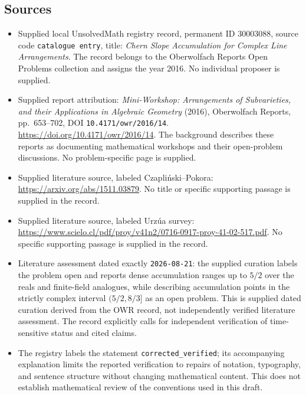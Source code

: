 \documentclass[11pt]{article}
\begin{document}
\subsection{Sources}
\begin{itemize}
\item Supplied local UnsolvedMath registry record, permanent ID \(30003088\), source code \texttt{catalogue entry}, title: \emph{Chern Slope Accumulation for Complex Line Arrangements}. The record belongs to the Oberwolfach Reports Open Problems collection and assigns the year 2016. No individual proposer is supplied.
\item Supplied report attribution: \emph{Mini-Workshop: Arrangements of Subvarieties, and their Applications in Algebraic Geometry} (2016), Oberwolfach Reports, pp.\ 653--702, DOI \texttt{10.4171/owr/2016/14}. \url{https://doi.org/10.4171/owr/2016/14}. The background describes these reports as documenting mathematical workshops and their open-problem discussions. No problem-specific page is supplied.
\item Supplied literature source, labeled Czapliński--Pokora: \url{https://arxiv.org/abs/1511.03879}. No title or specific supporting passage is supplied in the record.
\item Supplied literature source, labeled Urzúa survey: \url{https://www.scielo.cl/pdf/proy/v41n2/0716-0917-proy-41-02-517.pdf}. No specific supporting passage is supplied in the record.
\item Literature assessment dated exactly \texttt{2026-08-21}: the supplied curation labels the problem open and reports dense accumulation ranges up to \(5/2\) over the reals and finite-field analogues, while describing accumulation points in the strictly complex interval \((5/2,8/3]\) as an open problem. This is supplied dated curation derived from the OWR record, not independently verified literature assessment. The record explicitly calls for independent verification of time-sensitive status and cited claims.
\item The registry labels the statement \texttt{corrected\_verified}; its accompanying explanation limits the reported verification to repairs of notation, typography, and sentence structure without changing mathematical content. This does not establish mathematical review of the conventions used in this draft.
\end{itemize}
\end{document}
